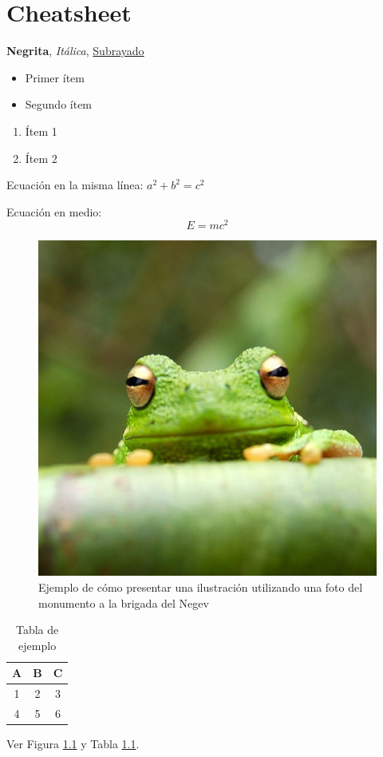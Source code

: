 \chapter{Cheatsheet}

\textbf{Negrita}, \textit{Itálica}, \underline{Subrayado}  

\begin{itemize}
    \item Primer ítem
    \item Segundo ítem
\end{itemize}

\begin{enumerate}
    \item Ítem 1
    \item Ítem 2
\end{enumerate}

Ecuación en la misma línea: $a^2 + b^2 = c^2$

Ecuación en medio: $$E = mc^2$$

\begin{figure}[htbp]
    \centering
    \includegraphics[width=0.3\linewidth]{figuras/frog.jpg}
    \caption{Ejemplo de cómo presentar una ilustración utilizando una foto del monumento a la brigada del Negev}
    \label{fig:ejemplo}
\end{figure}

\begin{table}[htbp]
    \centering
    \caption{Tabla de ejemplo}
    \begin{tabular}{|c|c|c|}
    \hline
    A & B & C \\ \hline
    1 & 2 & 3 \\ \hline
    4 & 5 & 6 \\ \hline
    \end{tabular}
    \label{tab:ejemplo}
\end{table}

Ver Figura \ref{fig:ejemplo} y Tabla \ref{tab:ejemplo}.

